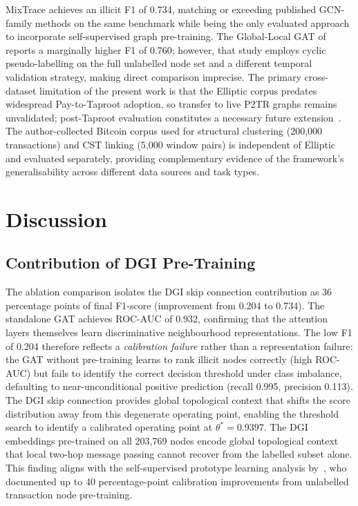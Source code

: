 \documentclass[12pt,a4paper]{article}
\begin{document}
MixTrace achieves an illicit F1 of 0.734, matching or
exceeding published GCN-family methods on the same benchmark
while being the only evaluated approach to incorporate
self-supervised graph pre-training.
The Global-Local GAT of~\citet{globalloc2025} reports a
marginally higher F1 of 0.760; however, that study employs
cyclic pseudo-labelling on the full unlabelled node set and
a different temporal validation strategy, making direct
comparison imprecise.
The primary cross-dataset limitation of the present work
is that the Elliptic corpus predates widespread
Pay-to-Taproot adoption, so transfer to live P2TR graphs
remains unvalidated; post-Taproot evaluation constitutes a
necessary future extension~\citep{coinjoin2024tdsc}.
The author-collected Bitcoin corpus used for structural
clustering (200,000 transactions) and CST linking
(5,000 window pairs) is independent of Elliptic and
evaluated separately, providing complementary evidence of
the framework's generalisability across different data
sources and task types.

\section{Discussion}
\label{sec:discuss}

\subsection{Contribution of DGI Pre-Training}

The ablation comparison isolates the DGI skip connection
contribution as 36 percentage points of final F1-score
(improvement from 0.204 to 0.734). The standalone GAT
achieves ROC-AUC of 0.932, confirming that the attention
layers themselves learn discriminative neighbourhood
representations. The low F1 of 0.204 therefore reflects
a \emph{calibration failure} rather than a representation
failure: the GAT without pre-training learns to rank illicit
nodes correctly (high ROC-AUC) but fails to identify the
correct decision threshold under class imbalance, defaulting
to near-unconditional positive prediction (recall 0.995,
precision 0.113). The DGI skip connection provides global
topological context that shifts the score distribution
away from this degenerate operating point, enabling the
threshold search to identify a calibrated operating point
at $\theta^* = 0.9397$. The DGI embeddings
pre-trained on all 203,769 nodes encode global topological
context that local two-hop message passing cannot recover
from the labelled subset alone. This finding aligns with
the self-supervised prototype learning analysis
by~\citet{graphanomaly2024}, who documented up to 40
percentage-point calibration improvements from unlabelled
transaction node pre-training.
\end{document}
